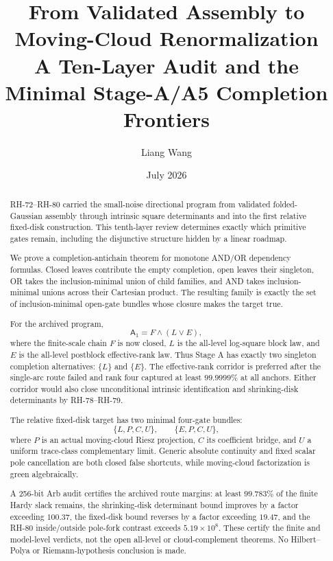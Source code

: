 \documentclass[11pt]{article}
\title{From Validated Assembly to Moving-Cloud Renormalization\\
\large A Ten-Layer Audit and the Minimal Stage-A/A5 Completion Frontiers}
\author{Liang Wang}
\date{July 2026}
\theoremstyle{definition}
\theoremstyle{remark}
\newcommand{\A}{\mathsf A}
\begin{document}
\maketitle

\begin{abstract}
RH-72--RH-80 carried the small-noise directional program from validated
folded-Gaussian assembly through intrinsic square determinants and into the
first relative fixed-disk construction.  This tenth-layer review determines
exactly which primitive gates remain, including the disjunctive structure
hidden by a linear roadmap.

We prove a completion-antichain theorem for monotone AND/OR dependency
formulas.  Closed leaves contribute the empty completion, open leaves their
singleton, OR takes the inclusion-minimal union of child families, and AND
takes inclusion-minimal unions across their Cartesian product.  The resulting
family is exactly the set of inclusion-minimal open-gate bundles whose closure
makes the target true.

For the archived program,
\[
 \A_1=F\wedge(L\vee E),
\]
where the finite-scale chain $F$ is now closed, $L$ is the all-level
log-square block law, and $E$ is the all-level postblock effective-rank law.
Thus Stage A has exactly two singleton completion alternatives:
$\{L\}$ and $\{E\}$.  The effective-rank corridor is preferred after the
single-arc route failed and rank four captured at least $99.9999\%$ at all
anchors.  Either corridor would also close unconditional intrinsic
identification and shrinking-disk determinants by RH-78--RH-79.

The relative fixed-disk target has two minimal four-gate bundles:
\[
 \{L,P,C,U\},\qquad \{E,P,C,U\},
\]
where $P$ is an actual moving-cloud Riesz projection, $C$ its coefficient
bridge, and $U$ a uniform trace-class complementary limit.  Generic absolute
continuity and fixed scalar pole cancellation are both closed false
shortcuts, while moving-cloud factorization is green algebraically.

A 256-bit Arb audit certifies the archived route margins: at least
$99.783\%$ of the finite Hardy slack remains, the shrinking-disk determinant
bound improves by a factor exceeding $100.37$, the fixed-disk bound reverses
by a factor exceeding $19.47$, and the RH-80 inside/outside pole-fork contrast
exceeds $5.19\times10^8$.  These certify the finite and model-level verdicts,
not the open all-level or cloud-complement theorems.  No Hilbert--Polya or
Riemann-hypothesis conclusion is made.
\end{abstract}
\end{document}
